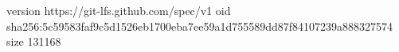 version https://git-lfs.github.com/spec/v1
oid sha256:5c59583faf9c5d1526eb1700eba7ee59a1d755589dd87f84107239a888327574
size 131168
